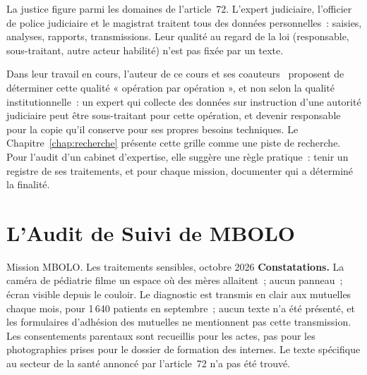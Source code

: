 La justice figure parmi les domaines de l'article~72. L'expert judiciaire,
l'officier de police judiciaire et le magistrat traitent tous des données
personnelles~: saisies, analyses, rapports, transmissions. Leur qualité au
regard de la loi (responsable, sous-traitant, autre acteur habilité) n'est
pas fixée par un texte.

Dans leur travail en cours, l'auteur de ce cours et ses
coauteurs~\cite{minka2026chainepenale} proposent de déterminer cette qualité
« opération par opération », et non selon la qualité institutionnelle~:
un expert qui collecte des données sur instruction d'une autorité
judiciaire peut être sous-traitant pour cette opération, et devenir
responsable pour la copie qu'il conserve pour ses propres besoins
techniques. Le Chapitre~\ref{chap:recherche} présente cette grille comme
une piste de recherche. Pour l'audit d'un cabinet d'expertise, elle
suggère une règle pratique~: tenir un registre de ses traitements, et
pour chaque mission, documenter qui a déterminé la finalité.

\section{L'Audit de Suivi de MBOLO}
\label{sec:c15-mbolo}

\begin{boxscenario}{Mission MBOLO. Les traitements sensibles, octobre 2026}
\textbf{Constatations.} La caméra de pédiatrie filme un espace où des mères
allaitent~; aucun panneau~; écran visible depuis le couloir. Le diagnostic
est transmis en clair aux mutuelles chaque mois, pour 1\,640 patients en
septembre~; aucun texte n'a été présenté, et les formulaires d'adhésion des
mutuelles ne mentionnent pas cette transmission. Les consentements
parentaux sont recueillis pour les actes, pas pour les photographies prises
pour le dossier de formation des internes. Le texte spécifique au secteur
de la santé annoncé par l'article~72 n'a pas été trouvé.
\end{boxscenario}

